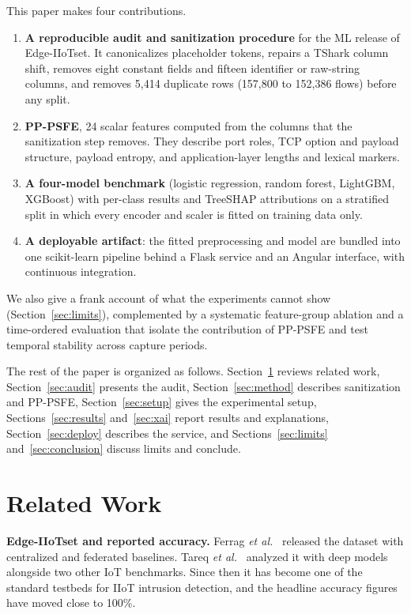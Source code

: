 \documentclass[journal]{IEEEtran}
\begin{document}
This paper makes four contributions.
\begin{enumerate}
\item \textbf{A reproducible audit and sanitization procedure} for the ML release of Edge-IIoTset. It canonicalizes placeholder tokens, repairs a TShark column shift, removes eight constant fields and fifteen identifier or raw-string columns, and removes 5,414 duplicate rows (157,800 to 152,386 flows) before any split.
\item \textbf{PP-PSFE}, 24 scalar features computed from the columns that the sanitization step removes. They describe port roles, TCP option and payload structure, payload entropy, and application-layer lengths and lexical markers.
\item \textbf{A four-model benchmark} (logistic regression, random forest, LightGBM, XGBoost) with per-class results and TreeSHAP attributions on a stratified split in which every encoder and scaler is fitted on training data only.
\item \textbf{A deployable artifact}: the fitted preprocessing and model are bundled into one scikit-learn pipeline behind a Flask service and an Angular interface, with continuous integration.
\end{enumerate}
We also give a frank account of what the experiments cannot show (Section~\ref{sec:limits}), complemented by a systematic feature-group ablation and a time-ordered evaluation that isolate the contribution of PP-PSFE and test temporal stability across capture periods.

The rest of the paper is organized as follows. Section~\ref{sec:related} reviews related work, Section~\ref{sec:audit} presents the audit, Section~\ref{sec:method} describes sanitization and PP-PSFE, Section~\ref{sec:setup} gives the experimental setup, Sections~\ref{sec:results} and~\ref{sec:xai} report results and explanations, Section~\ref{sec:deploy} describes the service, and Sections~\ref{sec:limits} and~\ref{sec:conclusion} discuss limits and conclude.


\section{Related Work}\label{sec:related}
\textbf{Edge-IIoTset and reported accuracy.} Ferrag \emph{et al.}~\cite{ferrag2022} released the dataset with centralized and federated baselines. Tareq \emph{et al.}~\cite{tareq2022} analyzed it with deep models alongside two other IoT benchmarks. Since then it has become one of the standard testbeds for IIoT intrusion detection, and the headline accuracy figures have moved close to 100\%.
\end{document}
